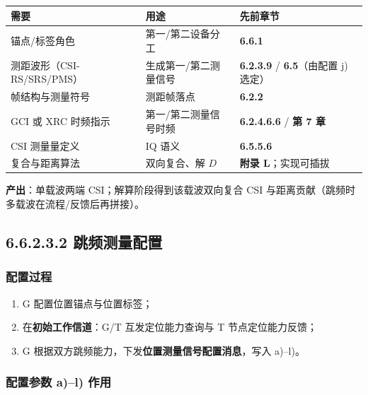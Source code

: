 \documentclass[11pt,a4paper]{ctexart}
\begin{document}
\begin{center}
\small
\begin{tabular}{|L{3.5cm}|L{4.5cm}|L{5cm}|}
\hline
\textbf{需要} & \textbf{用途} & \textbf{先前章节} \\
\hline
锚点/标签角色 & 第一/第二设备分工 & \textbf{6.6.1} \\
\hline
测距波形（CSI-RS/SRS/PMS） & 生成第一/第二测量信号 & \textbf{6.2.3.9} / \textbf{6.5}（由配置 j) 选定） \\
\hline
帧结构与测量符号 & 测距帧落点 & \textbf{6.2.2} \\
\hline
GCI 或 XRC 时频指示 & 第一/第二测量信号时频 & \textbf{6.2.4.6.6} / \textbf{第 7 章} \\
\hline
CSI 测量量定义 & IQ 语义 & \textbf{6.5.5.6} \\
\hline
复合与距离算法 & 双向复合、解 $D$ & \textbf{附录 L}；实现可插拔 \\
\hline
\end{tabular}
\end{center}

\textbf{产出}：单载波两端 CSI；解算阶段得到该载波双向复合 CSI 与距离贡献（跳频时多载波在流程/反馈后再拼接）。

\subsection{6.6.2.3.2 跳频测量配置}
\label{sec:config}

\subsubsection*{配置过程}

\begin{enumerate}[nosep]
  \item G 配置位置锚点与位置标签；
  \item 在\textbf{初始工作信道}：G/T 互发定位能力查询与 T 节点定位能力反馈；
  \item G 根据双方跳频能力，下发\textbf{位置测量信号配置消息}，写入 a)--l)。
\end{enumerate}

\subsubsection*{配置参数 a)--l) 作用}
\end{document}
